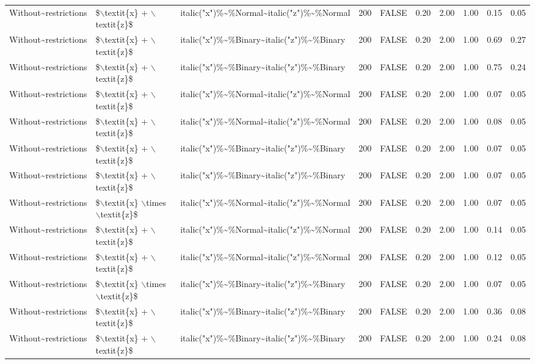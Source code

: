 \begin{longtable}{lllrlrrrrr}
  Without\~{}restrictions & \$$\backslash$textit\{x\} + $\backslash$textit\{z\}\$ & italic("x")\%\~{}\%Normal\~{}italic("z")\%\~{}\%Normal & 200 & FALSE & 0.20 & 2.00 & 1.00 & 0.15 & 0.05 \\ 
  Without\~{}restrictions & \$$\backslash$textit\{x\} + $\backslash$textit\{z\}\$ & italic("x")\%\~{}\%Binary\~{}italic("z")\%\~{}\%Binary & 200 & FALSE & 0.20 & 2.00 & 1.00 & 0.69 & 0.27 \\ 
  Without\~{}restrictions & \$$\backslash$textit\{x\} + $\backslash$textit\{z\}\$ & italic("x")\%\~{}\%Binary\~{}italic("z")\%\~{}\%Binary & 200 & FALSE & 0.20 & 2.00 & 1.00 & 0.75 & 0.24 \\ 
  Without\~{}restrictions & \$$\backslash$textit\{x\} + $\backslash$textit\{z\}\$ & italic("x")\%\~{}\%Normal\~{}italic("z")\%\~{}\%Normal & 200 & FALSE & 0.20 & 2.00 & 1.00 & 0.07 & 0.05 \\ 
  Without\~{}restrictions & \$$\backslash$textit\{x\} + $\backslash$textit\{z\}\$ & italic("x")\%\~{}\%Normal\~{}italic("z")\%\~{}\%Normal & 200 & FALSE & 0.20 & 2.00 & 1.00 & 0.08 & 0.05 \\ 
  Without\~{}restrictions & \$$\backslash$textit\{x\} + $\backslash$textit\{z\}\$ & italic("x")\%\~{}\%Binary\~{}italic("z")\%\~{}\%Binary & 200 & FALSE & 0.20 & 2.00 & 1.00 & 0.07 & 0.05 \\ 
  Without\~{}restrictions & \$$\backslash$textit\{x\} + $\backslash$textit\{z\}\$ & italic("x")\%\~{}\%Binary\~{}italic("z")\%\~{}\%Binary & 200 & FALSE & 0.20 & 2.00 & 1.00 & 0.07 & 0.05 \\ 
  Without\~{}restrictions & \$$\backslash$textit\{x\} $\backslash$times $\backslash$textit\{z\}\$ & italic("x")\%\~{}\%Normal\~{}italic("z")\%\~{}\%Normal & 200 & FALSE & 0.20 & 2.00 & 1.00 & 0.07 & 0.05 \\ 
  Without\~{}restrictions & \$$\backslash$textit\{x\} + $\backslash$textit\{z\}\$ & italic("x")\%\~{}\%Normal\~{}italic("z")\%\~{}\%Normal & 200 & FALSE & 0.20 & 2.00 & 1.00 & 0.14 & 0.05 \\ 
  Without\~{}restrictions & \$$\backslash$textit\{x\} + $\backslash$textit\{z\}\$ & italic("x")\%\~{}\%Normal\~{}italic("z")\%\~{}\%Normal & 200 & FALSE & 0.20 & 2.00 & 1.00 & 0.12 & 0.05 \\ 
  Without\~{}restrictions & \$$\backslash$textit\{x\} $\backslash$times $\backslash$textit\{z\}\$ & italic("x")\%\~{}\%Binary\~{}italic("z")\%\~{}\%Binary & 200 & FALSE & 0.20 & 2.00 & 1.00 & 0.07 & 0.05 \\ 
  Without\~{}restrictions & \$$\backslash$textit\{x\} + $\backslash$textit\{z\}\$ & italic("x")\%\~{}\%Binary\~{}italic("z")\%\~{}\%Binary & 200 & FALSE & 0.20 & 2.00 & 1.00 & 0.36 & 0.08 \\ 
  Without\~{}restrictions & \$$\backslash$textit\{x\} + $\backslash$textit\{z\}\$ & italic("x")\%\~{}\%Binary\~{}italic("z")\%\~{}\%Binary & 200 & FALSE & 0.20 & 2.00 & 1.00 & 0.24 & 0.08 \\ 
   \hline
\hline
\end{longtable}
